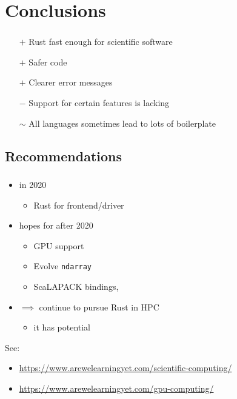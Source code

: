 \documentclass[aspectratio=43, t]{beamer}
\begin{document}
\section*{Conclusions}
\begin{frame}
	\frametitle{\secname}
	\begin{itemize}
		\item[$+$] Rust fast enough for scientific software
		\item[$+$]    Safer code
		\item[$+$]    Clearer error messages
		\item[$-$]    Support for certain features is lacking
		\item[$\sim$] All languages sometimes lead to lots of boilerplate
	\end{itemize}

\end{frame}

\subsection*{Recommendations}
\begin{frame}
	\frametitle{\subsecname}
	\begin{itemize}
		\item in 2020
			\begin{itemize}
				\item Rust for frontend/driver
			\end{itemize}
		\item hopes for after 2020
			\begin{itemize}
				\item GPU support
				\item Evolve \texttt{ndarray}
				\item ScaLAPACK bindings, \textellipsis
			\end{itemize}
		\item $\implies$ continue to pursue Rust in HPC
			\begin{itemize}
				\item it has potential
			\end{itemize}
	\end{itemize}

	See:
	\begin{itemize}
		\item \url{https://www.arewelearningyet.com/scientific-computing/}
		\item \url{https://www.arewelearningyet.com/gpu-computing/}
	\end{itemize}

\end{frame}
\end{document}
